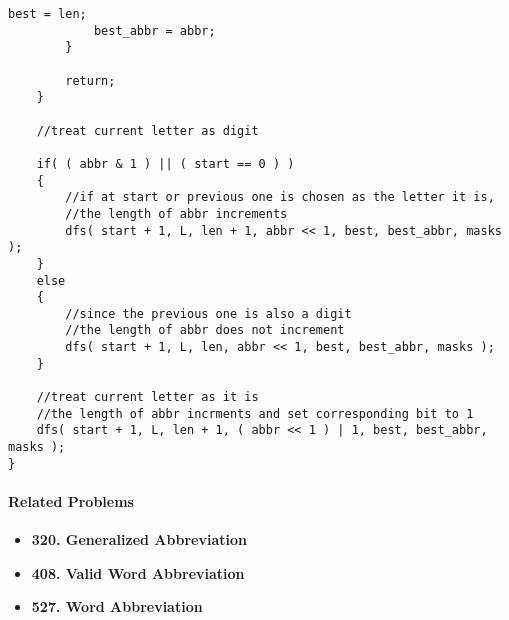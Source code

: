 \begin{lstlisting}[style=customc, caption={Bit Mask}]
            best = len;
            best_abbr = abbr;
        }

        return;
    }

    //treat current letter as digit

    if( ( abbr & 1 ) || ( start == 0 ) )
    {
        //if at start or previous one is chosen as the letter it is,
        //the length of abbr increments
        dfs( start + 1, L, len + 1, abbr << 1, best, best_abbr, masks );
    }
    else
    {
        //since the previous one is also a digit
        //the length of abbr does not increment
        dfs( start + 1, L, len, abbr << 1, best, best_abbr, masks );
    }

    //treat current letter as it is
    //the length of abbr incrments and set corresponding bit to 1
    dfs( start + 1, L, len + 1, ( abbr << 1 ) | 1, best, best_abbr, masks );
}
\end{lstlisting}

\paragraph{Related Problems}
\begin{itemize}
\item \textbf{320. Generalized Abbreviation}
\item \textbf{408. Valid Word Abbreviation}
\item \textbf{527. Word Abbreviation}
\end{itemize}